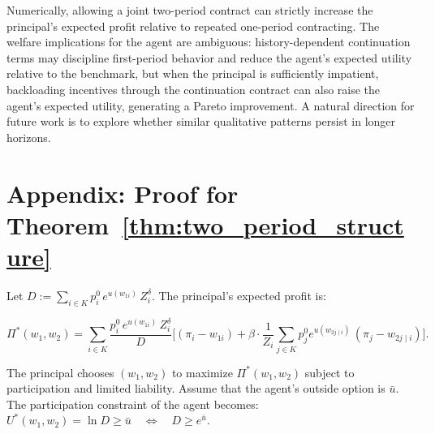 \documentclass[12pt]{article}
\theoremstyle{definition}
\begin{document}
Numerically, allowing a joint two-period contract can strictly increase the principal’s expected profit relative to repeated one-period contracting. 
The welfare implications for the agent are ambiguous: history-dependent continuation terms may discipline first-period behavior and reduce the agent’s 
expected utility relative to the benchmark, but when the principal is sufficiently impatient, backloading incentives through the continuation 
contract can also raise the agent’s expected utility, generating a Pareto improvement. A natural direction for future work is to explore whether similar qualitative patterns persist in longer horizons.

\section{Appendix: Proof for Theorem~\ref{thm:two_period_structure}}
\label{app:general_u}
Let $D:=\sum_{i\in K}p_i^0\,e^{u(w_{1i})}\,Z_i^\delta$. The principal's expected profit is:

\begin{equation}\label{eq:principal_problem}
  \Pi^*(w_1,w_2)
=
\sum_{i\in K}
\frac{p_i^0\,e^{u(w_{1i})}\,Z_i^\delta}{D}
\Bigg[
(\pi_i-w_{1i})
+\beta\cdot \frac{1}{Z_i}\sum_{j\in K}p_j^0 e^{u(w_{2j\mid i})}\,(\pi_j-w_{2j\mid i})
\Bigg].
\end{equation}


The principal chooses $(w_1,w_2)$ to maximize $\Pi^*(w_1,w_2)$ subject to participation and limited liability. Assume that the agent's outside 
option is $\bar{u}$. The participation constraint of the agent becomes: $U^*(w_1,w_2)=\ln D\ge \bar u\quad\Longleftrightarrow\quad D\ge e^{\bar u}.$
\end{document}
